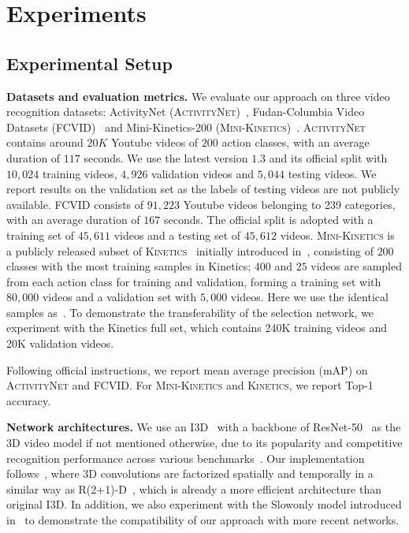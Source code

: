 \documentclass[final]{cvpr}
\newcommand{\anet}{{\scshape ActivityNet}\xspace}
\newcommand{\fcvid}{{\scshape FCVID}\xspace}
\newcommand{\minik}{{\scshape Mini-Kinetics}\xspace}
\newcommand{\kn}{{\scshape Kinetics}\xspace}
\begin{document}
\section{Experiments}

\subsection{Experimental Setup} \label{sec:exp_setup}
\noindent\textbf{Datasets and evaluation metrics.} We evaluate our approach on three video recognition datasets: ActivityNet (\anet)~\cite{anet}, Fudan-Columbia Video Datasets (\fcvid)~\cite{fcvid} and Mini-Kinetics-200 (\minik)~\cite{s3d}. \anet contains around $20K$ Youtube videos of $200$ action classes, with an average duration of $117$ seconds. We use the latest version $1.3$ and its official split with $10,024$ training videos, $4,926$ validation videos and $5,044$ testing videos. We report results on the validation set as the labels of testing videos are not publicly available. \fcvid consists of $91,223$ Youtube videos belonging to 239  categories, with an average duration of $167$ seconds. The official split is adopted with a training set of $45,611$ videos and a testing set of $45,612$ videos. \minik is a publicly released subset of \kn~\cite{quovadis} initially introduced in~\cite{s3d}, consisting of $200$ classes with the most training samples in Kinetics; $400$ and $25$ videos are sampled from each action class for training and validation, forming a training set with $80,000$ videos and a validation set with $5,000$ videos. Here we use the identical samples as~\cite{s3d}. To demonstrate the transferability of the selection network, we experiment with the Kinetics full set, which contains 240K training videos and 20K validation videos.

Following official instructions, we report mean average precision (mAP) on \anet and \fcvid. For \minik and \kn, we report Top-1 accuracy.

\vspace{0.05in}
\noindent\textbf{Network architectures.} We use an I3D~\cite{quovadis} with a backbone of ResNet-50~\cite{resnet} as the 3D video model if not mentioned otherwise, due to its popularity and competitive recognition performance across various benchmarks~\cite{quovadis,sthsth,anet}. Our implementation follows~\cite{slowfast_repo}, where 3D convolutions are factorized spatially and temporally in a similar way as R(2+1)-D~\cite{r21d}, which is already a more efficient architecture than original I3D. In addition, we also experiment with the Slowonly model introduced in~\cite{slowfast} to demonstrate the compatibility of our approach with more recent networks.
\end{document}
